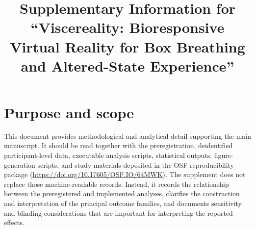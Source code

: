 \documentclass[pdflatex,sn-mathphys-num]{sn-jnl}
\begin{document}
\title[Supplementary Information: Viscereality]{Supplementary Information for ``Viscereality: Bioresponsive Virtual Reality for Box Breathing and Altered-State Experience''}

\author*[1,2,3]{ }
\author[4]{ }
\author{ }
\author[5]{ }
\author[6]{ }
\author[2]{ }
\author[7,8]{ }


\maketitle

\section{Purpose and scope}

This document provides methodological and analytical detail supporting the main manuscript. It should be read together with the preregistration, deidentified participant-level data, executable analysis scripts, statistical outputs, figure-generation scripts, and study materials deposited in the OSF reproducibility package (\url{https://doi.org/10.17605/OSF.IO/64MWK}). The supplement does not replace those machine-readable records. Instead, it records the relationship between the preregistered and implemented analyses, clarifies the construction and interpretation of the principal outcome families, and documents sensitivity and blinding considerations that are important for interpreting the reported effects.
\end{document}
